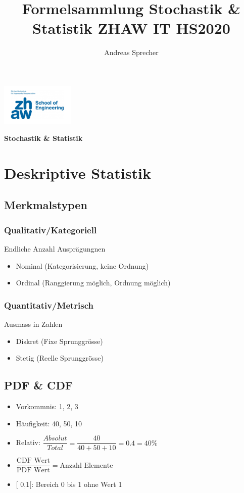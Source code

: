 \documentclass[8pt,a4paper]{scrartcl}
\title{Formelsammlung Stochastik & Statistik ZHAW IT HS2020}
\author{Andreas Sprecher}
\renewcommand{\emph}[1]{\textbf{#1}}                                                            %
\begin{document}
\begin{multicols*}{3}
\setlength{\columnseprule}{0.4pt}
    \parbox{4cm}{
        \includegraphics[height=2cm]{./img/Logo.jpeg}
    }
    \parbox{4cm}{
        \emph{\Large{Stochastik \& Statistik}}
    }
    \vspace{-2mm} 

    \section{Deskriptive Statistik}
    		\subsection{Merkmalstypen}
    			\subsubsection{Qualitativ/Kategoriell}
    				Endliche Anzahl Ausprägungnen
    				\begin{itemize}\itemsep0pt				
					\item Nominal (Kategorisierung, keine Ordnung)
					\item Ordinal (Ranggierung möglich, Ordnung möglich)
				\end{itemize}
    			\subsubsection{Quantitativ/Metrisch}
    				Ausmass in Zahlen
    				\begin{itemize}\itemsep0pt				
					\item Diskret (Fixe Sprunggrösse)
					\item Stetig (Reelle Sprunggrösse)
				\end{itemize}
		\subsection{PDF \& CDF}
			\begin{itemize}\itemsep0pt				
				\item Vorkommnis: 1, 2, 3
				\item Häufigkeit: 40, 50, 10
				\item Relativ: $\dfrac{Absolut}{Total} = \dfrac{40}{40+50+10} = 0.4 = 40 \%$
				\item $\dfrac{\textrm{CDF Wert}}{\textrm{PDF Wert}} = \textrm{Anzahl Elemente}$
				\item $[$ 0,1$[$: Bereich 0 bis 1 ohne Wert 1
			\end{itemize}		


\end{multicols*}
\end{document}
